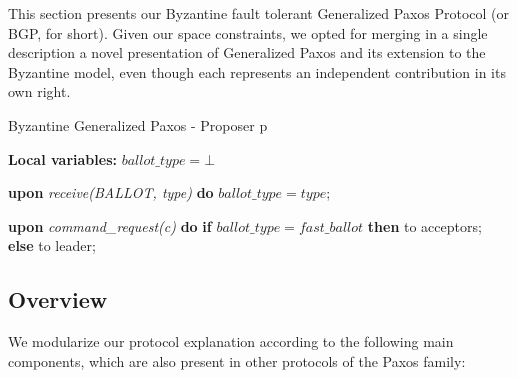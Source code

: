 This section presents our Byzantine fault tolerant Generalized Paxos
Protocol (or BGP, for short). Given our space constraints, we opted
for merging in a single description a novel presentation of
Generalized Paxos and its extension to the Byzantine model, even though
each represents an independent contribution in its own right.
\makeatletter
\algrenewcommand\ALG@beginalgorithmic{\tiny}
\makeatother
\captionsetup[algorithm]{font=footnotesize}

\begin{algorithm}
	\caption{Byzantine Generalized Paxos - Proposer p}
	\label{BFT-Prop}
	\textbf{Local variables:} $ballot\_type = \bot$
	\vspace*{-.5cm}
	\begin{multicols}{2}
		\begin{algorithmic}[1]	
			
			\State \textbf{upon} \textit{receive(BALLOT, type)} \textbf{do} 
			\State \hspace{\algorithmicindent} $ballot\_type = type$;
			\State
			
			\State \textbf{upon} \textit{command\_request(c)} \textbf{do}   \hspace{\algorithmicindent}\hspace{\algorithmicindent}\hspace{\algorithmicindent}\hspace{\algorithmicindent}
			\State \hspace{\algorithmicindent} \textbf{if} $ballot\_type = fast\_ballot$ \textbf{then}
			\State \hspace{\algorithmicindent}\hspace{\algorithmicindent}  to acceptors;
			\State \hspace{\algorithmicindent} \textbf{else} 
			\State \hspace{\algorithmicindent}\hspace{\algorithmicindent}  to leader;		
		\end{algorithmic}
	\end{multicols}
	\vspace*{-.4cm}
\end{algorithm}
\vspace*{-1.0cm}

\subsection{Overview}
We modularize our protocol explanation according to the following main components, which are also present in other protocols of the Paxos family:

